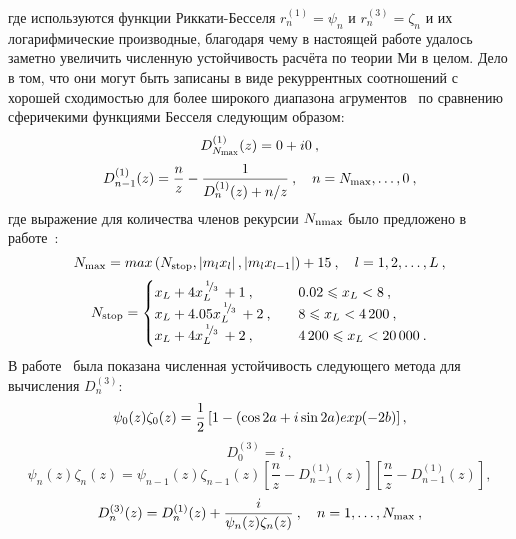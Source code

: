 где используются функции Риккати-Бесселя $r_n^{(1)} = \psi_n$ и
$r_n^{(3)} = \zeta_n$ и их логарифмические производные, благодаря чему
в настоящей работе удалось заметно увеличить численную устойчивость
расчёта по теории Ми в целом. Дело в том, что они могут быть записаны
в виде рекуррентных соотношений с хорошей сходимостью для более
широкого диапазона агрументов~\cite{Wiscombe-1980,Mackowski-1990} по
сравнению сферичекими функциями Бесселя следующим образом:
\begin{equation*}
  \label{eq:pena16a}
  D_{N_{\scalebox{0.65}{max}}}^{(1)}(z) = 0 + i0\:,
\end{equation*}
\begin{equation*}
  \label{eq:pena16b}
  D_{n-1}^{(1)}(z) = \frac{n}{z} -\frac{1}{D_n^{(1)}(z)+n/z}\:,\quad n=N_{\rm
    max}, \ldots, 0\:,
\end{equation*}
где выражение для количества членов рекурсии $N_{\rm nmax}$ было
предложено в работе~\cite{Wiscombe-1980}:
\begin{equation*}
  N_{\rm max} = max\left(N_{\rm stop}, \left|m_lx_l\right|,
    \left|m_lx_{l-1}\right|
\right) + 15\:, \quad l=1,2,\ldots,L\:,
\end{equation*}
\begin{equation*}
\label{eq:pena17}
  N_{\rm stop}=
\begin{cases}
x_L+4x_L^{\slantfrac{1}{3}}+1\:,\quad & 0.02\leqslant x_L<8\:,\\
x_L+4.05x_L^{\slantfrac{1}{3}}+2\:,\quad & 8\leqslant x_L<4\,200\:,\\
x_L+4x_L^{\slantfrac{1}{3}}+2\:,\quad & 4\,200\leqslant x_L<20\,000\:.\\
\end{cases}
\end{equation*}
В работе~\cite{Mackowski-1990} была показана численная устойчивость
следующего метода для вычисления $D_n^{(3)}$:
\begin{equation*}
  \label{eq:pena18a}
  \psi_0(z)\zeta_0(z)=\frac{1}{2}
\left[
1-({\rm cos}\,2a+i\,{\rm sin}\,2a)exp(-2b)
\right],
\end{equation*}
\begin{equation*}
  \label{eq:pena18b}
D_0^{(3)} = i\:,
\end{equation*}
\begin{equation*}
  \label{eq:pena18c}
  \psi_n(z)\zeta_n(z)=   \psi_{n-1}(z)\zeta_{n-1}(z)
\left[
\frac{n}{z}-D_{n-1}^{(1)}(z)
\right]
\left[
\frac{n}{z}-D_{n-1}^{(1)}(z)
\right],
\end{equation*}
\begin{equation*}
  \label{eq:pena18d}
D_n^{(3)}(z) = D_n^{(1)}(z)+\frac{i}{\psi_n(z)\zeta_n(z)}\:,\quad
n=1,\ldots, N_{\rm max}\:,
\end{equation*}
